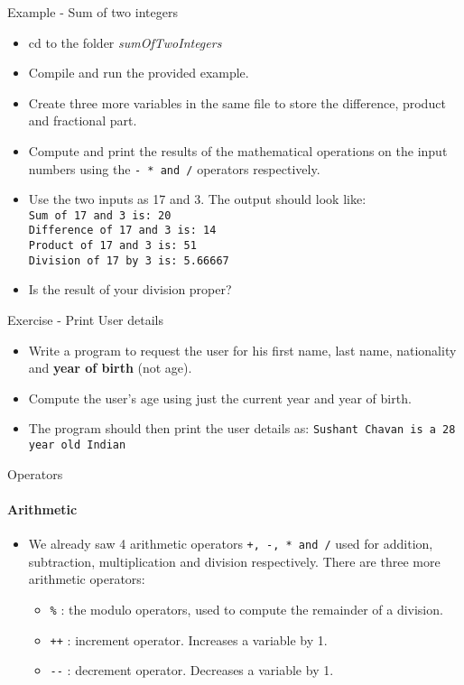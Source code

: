 \documentclass[aspectratio=169]{beamer}
\begin{document}
\begin{frame}[fragile]{Example - Sum of two integers}
	\begin{itemize}
		\item cd to the folder \textit{sumOfTwoIntegers}
		\item Compile and run the provided example.
		\item Create three more variables in the same file to store the difference, product and fractional part.
		\item Compute and print the results of the mathematical operations on the input numbers using the \verb|- * and /| operators respectively.
		\item Use the two inputs as 17 and 3. The output should look like: \\ \verb|Sum of 17 and 3 is: 20| \\ \verb|Difference of 17 and 3 is: 14| \\ \verb|Product of 17 and 3 is: 51| \\ \verb|Division of 17 by 3 is: 5.66667|
		\item Is the result of your division proper? 
	\end{itemize}
\end{frame}

\begin{frame}[fragile]{Exercise - Print User details}
	\begin{itemize}
		\item Write a program to request the user for his first name, last name, nationality and \textbf{year of birth} (not age).
		\item Compute the user's age using just the current year and year of birth.
		\item The program should then print the user details as: \verb|Sushant Chavan is a 28 year old Indian|
	\end{itemize}
\end{frame}

\begin{frame}[fragile]{Operators}
	\framesubtitle{Arithmetic}
	\begin{itemize}
		\item We already saw 4 arithmetic operators \verb|+, -, * and /| used for addition, subtraction, multiplication and division respectively. There are three more arithmetic operators:
		\begin{itemize}
			\item \verb|%| : the modulo operators, used to compute the remainder of a division.
			\item \verb|++| : increment operator. Increases a variable by 1.
			\item \verb|--| : decrement operator. Decreases a variable by 1.
		\end{itemize}
		
	\end{itemize}
\end{frame}
\end{document}
